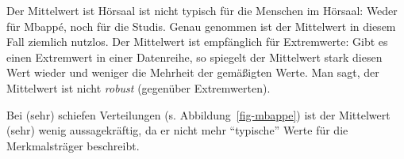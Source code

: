 \documentclass[
  letterpaper,
  oneside,
  open=any]{scrbook}
\theoremstyle{definition}
\theoremstyle{definition}
\theoremstyle{definition}
\theoremstyle{remark}
\begin{document}
Der Mittelwert ist Hörsaal ist nicht typisch für die Menschen im
Hörsaal: Weder für Mbappé, noch für die Studis. Genau genommen ist der
Mittelwert in diesem Fall ziemlich nutzlos. Der Mittelwert ist
empfänglich für Extremwerte: Gibt es einen Extremwert in einer
Datenreihe, so spiegelt der Mittelwert stark diesen Wert wieder und
weniger die Mehrheit der gemäßigten Werte. Man sagt, der Mittelwert ist
nicht \emph{robust} (gegenüber Extremwerten).

\begin{tcolorbox}[enhanced jigsaw, bottomrule=.15mm, left=2mm, colbacktitle=quarto-callout-important-color!10!white, bottomtitle=1mm, colframe=quarto-callout-important-color-frame, coltitle=black, rightrule=.15mm, breakable, toptitle=1mm, titlerule=0mm, title=\textcolor{quarto-callout-important-color}{\faExclamation}\hspace{0.5em}{Wichtig}, opacitybacktitle=0.6, arc=.35mm, colback=white, leftrule=.75mm, opacityback=0, toprule=.15mm]

Bei (sehr) schiefen Verteilungen (s. Abbildung~\ref{fig-mbappe}) ist der
Mittelwert (sehr) wenig aussagekräftig, da er nicht mehr
\enquote{typische} Werte für die Merkmalsträger beschreibt.

\end{tcolorbox}
\end{document}
